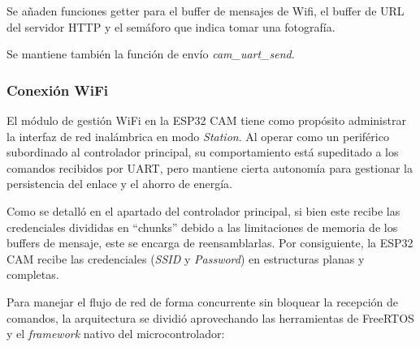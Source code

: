 Se añaden funciones getter para el buffer de mensajes de Wifi, el buffer de URL del servidor HTTP y el semáforo que indica tomar una fotografía.

Se mantiene también la función de envío  \textit{cam\_uart\_send}.


\subsubsection{Conexión WiFi}
El módulo de gestión WiFi en la ESP32 CAM tiene como propósito administrar la interfaz de red inalámbrica en modo \textit{Station}. Al operar como un periférico subordinado al controlador principal, su comportamiento está supeditado a los comandos recibidos por UART, pero mantiene cierta autonomía para gestionar la persistencia del enlace y el ahorro de energía.

Como se detalló en el apartado del controlador principal, si bien este recibe las credenciales divididas en \enquote{chunks} debido a las limitaciones de memoria de los buffers de mensaje, este se encarga de reensamblarlas. Por consiguiente, la ESP32 CAM recibe las credenciales (\textit{SSID} y \textit{Password}) en estructuras planas y completas.

Para manejar el flujo de red de forma concurrente sin bloquear la recepción de comandos, la arquitectura se dividió aprovechando las herramientas de FreeRTOS y el \textit{framework} nativo del microcontrolador:

